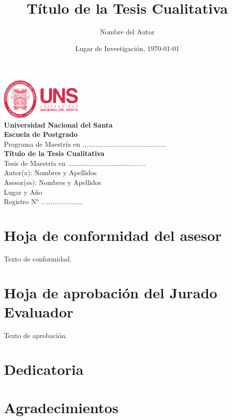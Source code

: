 \documentclass[12pt]{../componentes/uns}
\title{Título de la Tesis Cualitativa}
\author{Nombre del Autor}
\date{Lugar de Investigación, \today}
\begin{document}
\begin{titlepage}
    \centering
    \includegraphics[width=0.3\textwidth]{../componentes/logo_uns.png} \\
    \vspace{1cm}
    \textbf{\Large Universidad Nacional del Santa}\\
    \textbf{\large Escuela de Postgrado}\\
    Programa de Maestría en ............................................ \\
    \vspace{2cm}
    \textbf{\LARGE Título de la Tesis Cualitativa}\\
    \vspace{2cm}
    Tesis de Maestría en .........................................\\
    Autor(a): Nombres y Apellidos\\
    Asesor(es): Nombres y Apellidos\\
    \vfill
    Lugar y Año\\
    Registro N° ......................\\
\end{titlepage}

\newpage
\thispagestyle{empty}
\mbox{}

\newpage
\section*{Hoja de conformidad del asesor}
Texto de conformidad.

\newpage
\section*{Hoja de aprobación del Jurado Evaluador}
Texto de aprobación.

\newpage
\section*{Dedicatoria}
\lipsum[1] %

\newpage
\section*{Agradecimientos}
\lipsum[2] %
\end{document}
